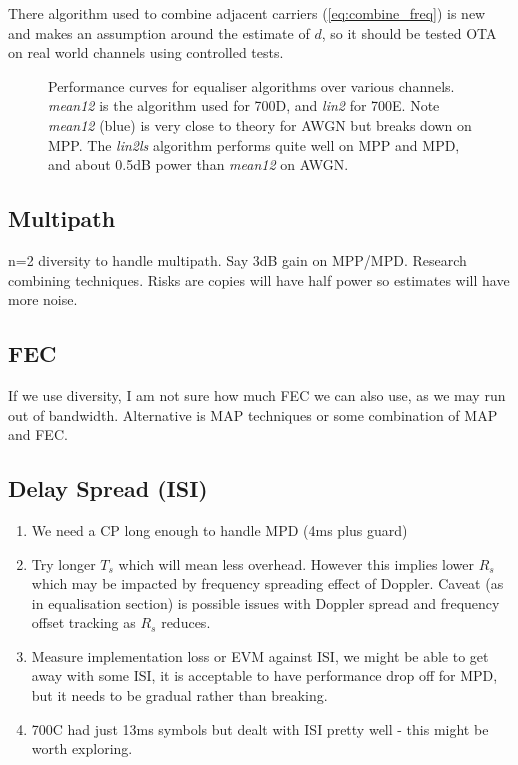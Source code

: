 \documentclass{article}
\begin{document}
There algorithm used to combine adjacent carriers (\ref{eq:combine_freq}) is new and makes an assumption around the estimate of $d$, so it should be tested OTA on real world channels using controlled tests.

\begin{figure}[h]
\caption{Performance curves for equaliser algorithms over various channels. \emph{mean12} is the algorithm used for 700D, and \emph{lin2} for 700E.  Note \emph{mean12} (blue) is very close to theory for AWGN but breaks down on MPP.  The \emph{lin2ls} algorithm performs quite well on MPP and MPD, and about 0.5dB power than \emph{mean12} on AWGN.}
\label{fig:equaliser_curves}
\begin{center}

\end{center}
\end{figure}


\subsection{Multipath}

n=2 diversity to handle multipath.  Say 3dB gain on MPP/MPD.  Research combining techniques. Risks are copies will have half power so estimates will have more noise.

\subsection{FEC}

If we use diversity, I am not sure how much FEC we can also use, as we may run out of bandwidth.  Alternative is MAP techniques or some combination of MAP and FEC.

\subsection{Delay Spread (ISI)}

\begin{enumerate}
\item We need a CP long enough to handle MPD (4ms plus guard)
\item Try longer $T_s$ which will mean less overhead. However this implies lower $R_s$ which may be impacted by frequency spreading effect of Doppler.  Caveat (as in equalisation section) is possible issues with Doppler spread and frequency offset tracking as $R_s$ reduces.
\item Measure implementation loss or EVM against ISI, we might be able to get away with some ISI, it is acceptable to have performance drop off for MPD, but it needs to be gradual rather than breaking.
\item 700C had just 13ms symbols but dealt with ISI pretty well - this might be worth exploring.
\end{enumerate}
\end{document}
